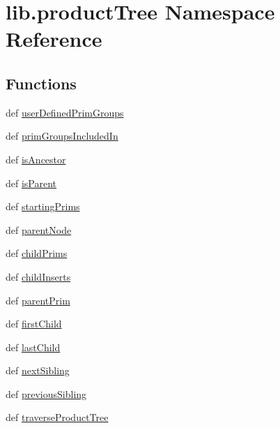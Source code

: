 \hypertarget{namespacelib_1_1product_tree}{\section{lib.\-product\-Tree Namespace Reference}
\label{namespacelib_1_1product_tree}
}
\subsection*{Functions}
\begin{DoxyCompactItemize}
\item 
def \hyperlink{namespacelib_1_1product_tree_afe65f669bc26c2e88cb9c01240f8b23f}{user\-Defined\-Prim\-Groups}
\item 
def \hyperlink{namespacelib_1_1product_tree_a6213cb13e6cd5f1d9138d891992a35ea}{prim\-Groups\-Included\-In}
\item 
def \hyperlink{namespacelib_1_1product_tree_a9a1e45dd23b20c6e2e43b2efbae0076f}{is\-Ancestor}
\item 
def \hyperlink{namespacelib_1_1product_tree_a2f996af78d7e5db1d4eb058ce9e59ce5}{is\-Parent}
\item 
def \hyperlink{namespacelib_1_1product_tree_aed1224e8c4ea27cc9ae4fc317f2ec870}{starting\-Prims}
\item 
def \hyperlink{namespacelib_1_1product_tree_aa8ad09eef705e5b03c9dde0ebb2789bf}{parent\-Node}
\item 
def \hyperlink{namespacelib_1_1product_tree_acea51a71c0ebb85ac094b289173d330c}{child\-Prims}
\item 
def \hyperlink{namespacelib_1_1product_tree_a01e4e75ed46feee50ab5cf77d26d31cc}{child\-Inserts}
\item 
def \hyperlink{namespacelib_1_1product_tree_a25c46de7b7818900c5fe6a4b082c1a7a}{parent\-Prim}
\item 
def \hyperlink{namespacelib_1_1product_tree_adefb22c8fe024f6434b283e4059174f3}{first\-Child}
\item 
def \hyperlink{namespacelib_1_1product_tree_ab1bac73b60fcdef94c6582f4975d4c5e}{last\-Child}
\item 
def \hyperlink{namespacelib_1_1product_tree_a5c50f7bd881cd00aecec69cc30495b5b}{next\-Sibling}
\item 
def \hyperlink{namespacelib_1_1product_tree_a5304cc776ec90f6b799b36b0fea68a57}{previous\-Sibling}
\item 
def \hyperlink{namespacelib_1_1product_tree_a2a9f2335e0fbd0f092f8e5c6eec1602e}{traverse\-Product\-Tree}

\end{DoxyCompactItemize}
